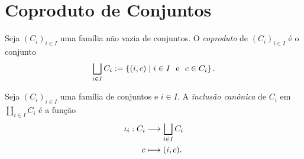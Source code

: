 




\section{Coproduto de Conjuntos}

\begin{defi}
Seja $(C_i)_{i \in I}$ uma família não vazia de conjuntos. O \emph{coproduto} de $(C_i)_{i \in I}$ é o conjunto
	\begin{equation*}
	\bigsqcup_{i \in I} C_i :=\left\{(i,c) \;\middle\vert\; i \in I \text{\ \ e\ \ } c \in C_i \right\}.
	\end{equation*}
\end{defi}

\begin{defi}
Seja $(C_i)_{i \in I}$ uma família de conjuntos e $i \in I$. A \emph{inclusão canônica} de $C_i$ em $\coprod_{i \in I} C_i$ é a função
	\begin{align*}
	{\iota_i}: {C_i} &\longrightarrow {\bigsqcup_{i \in I} C_i} \\{c} &\longmapsto {(i,c)}.
	\end{align*}
\end{defi}

